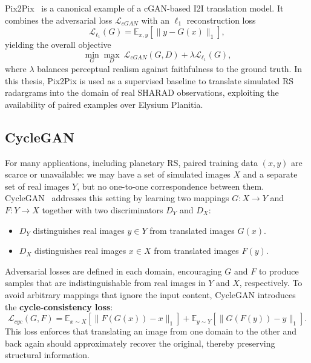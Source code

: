 Pix2Pix~\cite{Isola_2017} is a canonical example of a cGAN-based I2I translation model.
It combines the adversarial loss $\mathcal{L}_{cGAN}$ with an $\ell_1$ reconstruction loss
\begin{equation}
\mathcal{L}_{\ell_1}(G) = \mathbb{E}_{x,y}\left[ \| y - G(x) \|_1 \right],
\end{equation}
yielding the overall objective
\begin{equation}
\min_G \max_D \ \mathcal{L}_{cGAN}(G, D) + \lambda \mathcal{L}_{\ell_1}(G),
\end{equation}
where $\lambda$ balances perceptual realism against faithfulness to the ground truth.
In this thesis, Pix2Pix is used as a supervised baseline to translate simulated RS radargrams into the domain of real SHARAD observations, exploiting the availability of paired examples over Elysium Planitia.

\subsection{CycleGAN}
\label{subsec:cyclegan}
For many applications, including planetary RS, paired training data $(x, y)$ are scarce or unavailable: we may have a set of simulated images $X$ and a separate set of real images $Y$, but no one-to-one correspondence between them.
CycleGAN~\cite{Zhu_2017} addresses this setting by learning two mappings $G: X \to Y$ and $F: Y \to X$ together with two discriminators $D_Y$ and $D_X$:
\begin{itemize}
    \item $D_Y$ distinguishes real images $y \in Y$ from translated images $G(x)$.
    \item $D_X$ distinguishes real images $x \in X$ from translated images $F(y)$.
\end{itemize}
Adversarial losses are defined in each domain, encouraging $G$ and $F$ to produce samples that are indistinguishable from real images in $Y$ and $X$, respectively.
To avoid arbitrary mappings that ignore the input content, CycleGAN introduces the \textbf{cycle-consistency loss}:
\begin{equation}
\mathcal{L}_{cyc}(G, F) = \mathbb{E}_{x \sim X}\left[ \| F(G(x)) - x \|_1 \right] + \mathbb{E}_{y \sim Y}\left[ \| G(F(y)) - y \|_1 \right].
\end{equation}
This loss enforces that translating an image from one domain to the other and back again should approximately recover the original, thereby preserving structural information.

